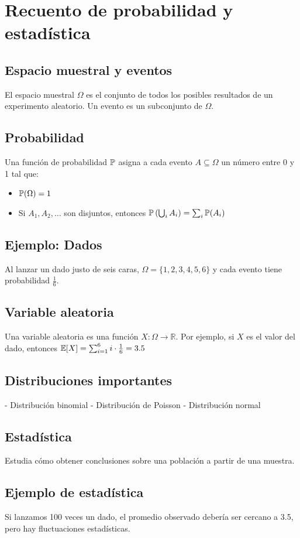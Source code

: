 \section{Recuento de probabilidad y estadística}

\subsection{Espacio muestral y eventos}
El espacio muestral $\Omega$ es el conjunto de todos los posibles resultados de un experimento aleatorio. Un evento es un subconjunto de $\Omega$.

\subsection{Probabilidad}
Una función de probabilidad $\mathbb{P}$ asigna a cada evento $A \subseteq \Omega$ un número entre 0 y 1 tal que:
\begin{itemize}
    \item $\mathbb{P}(\Omega) = 1$
    \item Si $A_1, A_2, \dots$ son disjuntos, entonces $\mathbb{P}\left(\bigcup_i A_i\right) = \sum_i \mathbb{P}(A_i)$
\end{itemize}

\subsection{Ejemplo: Dados}
Al lanzar un dado justo de seis caras, $\Omega = \{1, 2, 3, 4, 5, 6\}$ y cada evento tiene probabilidad $\frac{1}{6}$.

\subsection{Variable aleatoria}
Una variable aleatoria es una función $X: \Omega \rightarrow \mathbb{R}$. Por ejemplo, si $X$ es el valor del dado, entonces $\mathbb{E}[X] = \sum_{i=1}^6 i \cdot \frac{1}{6} = 3.5$

\subsection{Distribuciones importantes}
- Distribución binomial
- Distribución de Poisson
- Distribución normal

\subsection{Estadística}
Estudia cómo obtener conclusiones sobre una población a partir de una muestra.

\subsection{Ejemplo de estadística}
Si lanzamos 100 veces un dado, el promedio observado debería ser cercano a 3.5, pero hay fluctuaciones estadísticas.

